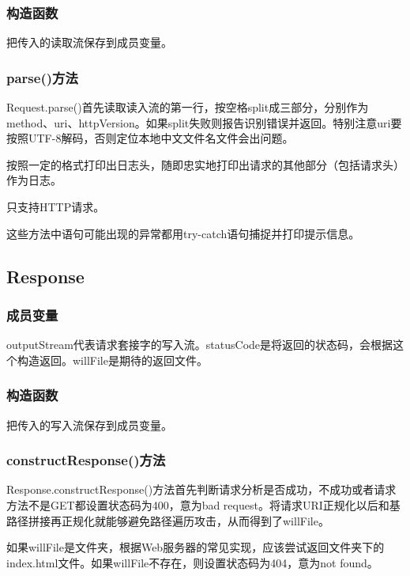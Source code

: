 \documentclass[UTF8,12pt]{ctexart}
\begin{document}
\subsubsection{构造函数}

把传入的读取流保存到成员变量。

\subsubsection{parse()方法}

Request.parse()首先读取读入流的第一行，按空格split成三部分，分别作为method、uri、httpVersion。如果split失败则报告识别错误并返回。特别注意uri要按照UTF-8解码，否则定位本地中文文件名文件会出问题。

按照一定的格式打印出日志头，随即忠实地打印出请求的其他部分（包括请求头）作为日志。

只支持HTTP请求。

\vspace*{2\baselineskip} 

这些方法中语句可能出现的异常都用try-catch语句捕捉并打印提示信息。

\subsection{Response}

\subsubsection{成员变量}

outputStream代表请求套接字的写入流。statusCode是将返回的状态码，会根据这个构造返回。willFile是期待的返回文件。

\subsubsection{构造函数}

把传入的写入流保存到成员变量。

\subsubsection{constructResponse()方法}

Response.constructResponse()方法首先判断请求分析是否成功，不成功或者请求方法不是GET都设置状态码为400，意为bad request。将请求URI正规化以后和基路径拼接再正规化就能够避免路径遍历攻击，从而得到了willFile。

如果willFile是文件夹，根据Web服务器的常见实现，应该尝试返回文件夹下的index.html文件。如果willFile不存在，则设置状态码为404，意为not found。
\end{document}
